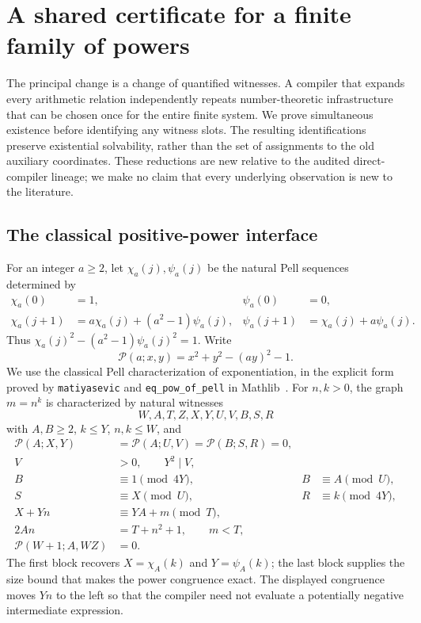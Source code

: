 \section{A shared certificate for a finite family of powers}
\label{sec:shared-arithmetic}

The principal change is a change of quantified witnesses.  A compiler that
expands every arithmetic relation independently repeats number-theoretic
infrastructure that can be chosen once for the entire finite system.
We prove simultaneous existence before identifying any witness slots.
The resulting identifications preserve existential solvability, rather
than the set of assignments to the old auxiliary coordinates.
These reductions are new relative to the audited direct-compiler lineage;
we make no claim that every underlying observation is new to the literature.

\subsection{The classical positive-power interface}

For an integer $a\geq2$, let $\chi_a(j),\psi_a(j)$ be the natural Pell
sequences determined by
\begin{align*}
 \chi_a(0)&=1,&\psi_a(0)&=0,\\
 \chi_a(j+1)&=a\chi_a(j)+(a^2-1)\psi_a(j),&
 \psi_a(j+1)&=\chi_a(j)+a\psi_a(j).
\end{align*}
Thus $\chi_a(j)^2-(a^2-1)\psi_a(j)^2=1$.  Write
\[
 \mathcal P(a;x,y)=x^2+y^2-(ay)^2-1.
\]
We use the classical Pell characterization of exponentiation, in the
explicit form proved by \texttt{matiyasevic} and
\texttt{eq\_pow\_of\_pell} in Mathlib~\cite{mathlibpell}.
For $n,k>0$, the graph $m=n^k$ is characterized by natural witnesses
\[
 W,A,T,Z,X,Y,U,V,B,S,R
\]
with $A,B\geq2$, $k\leq Y$, $n,k\leq W$, and
\begin{align}
 \mathcal P(A;X,Y)&=\mathcal P(A;U,V)
 =\mathcal P(B;S,R)=0,\label{eq:sa-three-norms}\\
 V&>0,\qquad Y^2\mid V,\label{eq:sa-v-divides}\\
 B&\equiv1\pmod{4Y},&B&\equiv A\pmod U,\label{eq:sa-b-crt}\\
 S&\equiv X\pmod U,&R&\equiv k\pmod{4Y},\label{eq:sa-index-congruences}\\
 X+Yn&\equiv YA+m\pmod T,\label{eq:sa-power-congruence}\\
 2An&=T+n^2+1,\qquad m<T,\label{eq:sa-t-bound}\\
 \mathcal P(W+1;A,WZ)&=0.\label{eq:sa-majorant-norm}
\end{align}
The first block recovers $X=\chi_A(k)$ and $Y=\psi_A(k)$; the last
block supplies the size bound that makes the power congruence exact.
The displayed congruence moves $Yn$ to the left so that the compiler need
not evaluate a potentially negative intermediate expression.

